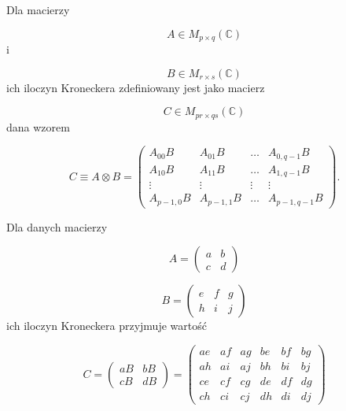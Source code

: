 \begin{definition}
    Dla macierzy

    $$
        A \in M_{p \times q}(\mathbb{C})
    $$
    i

    $$
        B \in M_{r\times s}(\mathbb{C})
    $$
    ich iloczyn Kroneckera zdefiniowany jest jako macierz

    $$
        C \in M_{pr\times qs}(\mathbb{C})
    $$
    dana wzorem

    \begin{equation}
        \label{equation:kronecker-product}
        C \equiv A \otimes B =
        \begin{pmatrix}
            A_{00} B & A_{01} B & \ldots & A_{0, q - 1} B \\
            A_{10} B & A_{11} B & \ldots & A_{1, q - 1} B \\
            \vdots & \vdots & \vdots & \vdots \\
            A_{p - 1, 0} B & A_{p - 1, 1} B & \ldots & A_{p - 1, q - 1} B
        \end{pmatrix}.
    \end{equation}
\end{definition}

\begin{example}
    Dla danych macierzy

    $$
        A =
        \begin{pmatrix}
            a & b \\
            c & d
        \end{pmatrix}
    $$

    $$
        B =
        \begin{pmatrix}
            e & f & g \\
            h & i & j
        \end{pmatrix}
    $$
    ich iloczyn Kroneckera przyjmuje wartość

    $$
        C =
        \begin{pmatrix}
            a B & b B \\
            c B & d B
        \end{pmatrix}
        =
        \begin{pmatrix}
            a e & a f & a g & b e & b f & b g \\
            a h & a i & a j & b h & b i & b j \\
            c e & c f & c g & d e & d f & d g \\
            c h & c i & c j & d h & d i & d j
        \end{pmatrix}
    $$
\end{example}

